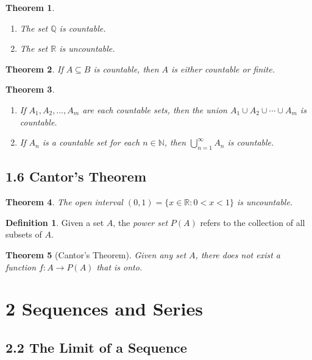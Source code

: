 \documentclass[11pt]{amsart}
\newtheorem*{theorem}{Theorem}
\theoremstyle{definition}
\newtheorem*{definition}{Definition}
\newcommand{\N}{\mathbb{N}}
\newcommand{\Q}{\mathbb{Q}}
\newcommand{\R}{\mathbb{R}}
\newcommand{\st}{\mathrel{:}}
\begin{document}
\begin{theorem}
  \begin{enumerate}[label={(\roman*)}]
    \item The set $\Q$ is countable.
    \item The set $\R$ is uncountable.
  \end{enumerate}
\end{theorem}

\begin{theorem}
  If $A \subseteq B$ is countable, then $A$ is either countable or finite.
\end{theorem}

\begin{theorem}
  \begin{enumerate}[label={(\roman*)}]
    \item If $A_1, A_2, \ldots, A_m$ are each countable sets, then the union
      $A_1 \cup A_2 \cup \cdots \cup A_m$ is countable.
    \item If $A_n$ is a countable set for each $n \in \N$, then
      $\bigcup_{n=1}^{\infty} A_n$ is countable.
  \end{enumerate}
\end{theorem}

\subsection*{1.6 Cantor's Theorem}

\begin{theorem}
  The open interval $(0, 1) = \{x \in \R \st 0 < x < 1\}$ is uncountable.
\end{theorem}

\begin{definition}
  Given a set $A$, the \emph{power set} $P(A)$ refers to the collection of all
  subsets of $A$.
\end{definition}

\begin{theorem}[Cantor's Theorem]
  Given any set $A$, there does not exist a function $f : A \rightarrow P(A)$
  that is onto.
\end{theorem}

\section*{2 Sequences and Series}

\subsection*{2.2 The Limit of a Sequence}
\end{document}
